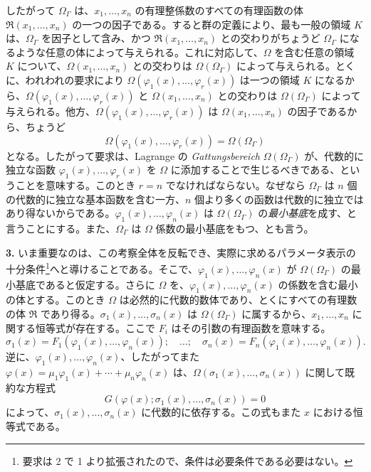 したがって $\Omega_\Gamma$ は、$x_1,
\ldots,x_n$ の有理整係数のすべての有理函数の体 $\mathfrak R(x_1,
\ldots,x_n)$ の一つの因子である。すると群の定義により、最も一般の領域 $K$ は、$\Omega_\Gamma$ を因子として含み、かつ $\mathfrak R(x_1,
\ldots,x_n)$ との交わりがちょうど $\Omega_\Gamma$ になるような任意の体によって与えられる。これに対応して、$\Omega$ を含む任意の領域 $K$ について、$\Omega(x_1,
\ldots,x_n)$ との交わりは $\Omega(\Omega_\Gamma)$ によって与えられる。とくに、われわれの要求により $\Omega(\varphi_1(x),\ldots,\varphi_r(x))$ は一つの領域 $K$ になるから、$\Omega(\varphi_1(x),\ldots,\varphi_r(x))$ と $\Omega(x_1,
\ldots,x_n)$ との交わりは $\Omega(\Omega_\Gamma)$ によって与えられる。他方、$\Omega(\varphi_1(x),\ldots,\varphi_r(x))$ は $\Omega(x_1,
\ldots,x_n)$ の因子であるから、ちょうど
\[
\Omega(\varphi_1(x),\ldots,\varphi_r(x))=\Omega(\Omega_\Gamma)
\]
となる。したがって要求は、Lagrange の \emph{Gattungsbereich} $\Omega(\Omega_\Gamma)$ が、代数的に独立な函数 $\varphi_1(x),\ldots,\varphi_r(x)$ を $\Omega$ に添加することで生じるべきである、ということを意味する。このとき $r=n$ でなければならない。なぜなら $\Omega_\Gamma$ は $n$ 個の代数的に独立な基本函数を含む一方、$n$ 個より多くの函数は代数的に独立ではあり得ないからである。$\varphi_1(x),\ldots,\varphi_n(x)$ は $\Omega(\Omega_\Gamma)$ の\emph{最小基底}を成す、と言うことにする。また、$\Omega_\Gamma$ は $\Omega$ 係数の最小基底をもつ、とも言う。

\textbf{3.} いま重要なのは、この考察全体を反転でき、実際に求めるパラメータ表示の十分条件\footnote{要求は 2 で 1 より拡張されたので、条件は必要条件である必要はない。}へと導けることである。そこで、$\varphi_1(x),\ldots,\varphi_n(x)$ が $\Omega(\Omega_\Gamma)$ の最小基底であると仮定する。さらに $\Omega$ を、$\varphi_1(x),\ldots,\varphi_n(x)$ の係数を含む最小の体とする。このとき $\Omega$ は必然的に代数的数体であり、とくにすべての有理数の体 $\mathfrak R$ であり得る。$\sigma_1(x),\ldots,\sigma_n(x)$ は $\Omega(\Omega_\Gamma)$ に属するから、$x_1,
\ldots,x_n$ に関する恒等式が存在する。ここで $F_i$ はその引数の有理函数を意味する。
\begin{equation}\tag{5}
\sigma_1(x)=F_1(\varphi_1(x),\ldots,\varphi_n(x));\quad\ldots;\quad
\sigma_n(x)=F_n(\varphi_1(x),\ldots,\varphi_n(x)).
\end{equation}
逆に、$\varphi_1(x),\ldots,\varphi_n(x)$、したがってまた
$\varphi(x)=\mu_1\varphi_1(x)+\cdots+\mu_n\varphi_n(x)$ は、$\Omega(\sigma_1(x),\ldots,\sigma_n(x))$ に関して既約な方程式
\begin{equation}\tag{6}
G(\varphi(x);\sigma_1(x),\ldots,\sigma_n(x))=0
\end{equation}
によって、$\sigma_1(x),\ldots,\sigma_n(x)$ に代数的に依存する。この式もまた $x$ における恒等式である。

